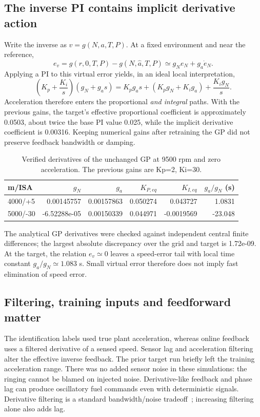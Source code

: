 \documentclass[11pt,a4paper]{article}
\begin{document}
\subsection{The inverse PI contains implicit derivative action}
Write the inverse as $v=g(N,a,T,P)$. At a fixed environment and near the reference,
\begin{equation}
e_v=g(r,0,T,P)-g(N,\hat a,T,P)\simeq g_N e_N+g_a\dot e_N.
\end{equation}
Applying a PI to this virtual error yields, in an ideal local interpretation,
\begin{equation}
\left(K_p+\frac{K_i}{s}\right)(g_N+g_as)
=K_pg_as+(K_pg_N+K_ig_a)+\frac{K_ig_N}{s}.
\end{equation}
Acceleration therefore enters the proportional \emph{and integral} paths. With the previous gains, the target's effective proportional coefficient is approximately 0.0503, about twice the base PI value 0.025, while the implicit derivative coefficient is 0.00316. Keeping numerical gains after retraining the GP did not preserve feedback bandwidth or damping.

\begin{table}[H]\centering\small\setlength{\tabcolsep}{5pt}
\begin{tabular}{@{}lrrrrr@{}}\toprule
m/ISA & $g_N$ & $g_a$ & $K_{P,eq}$ & $K_{I,eq}$ & $g_a/g_N$ (s)\\\midrule
4000/+5 & 0.00145757 & 0.00157863 & 0.050274 & 0.043727 & 1.0831\\
5000/-30 & -6.52288e-05 & 0.00150339 & 0.044971 & -0.0019569 & -23.048\\
\bottomrule\end{tabular}\caption{Verified derivatives of the unchanged GP at 9500 rpm and zero acceleration. The previous gains are Kp=2, Ki=30.}\end{table}

The analytical GP derivatives were checked against independent central finite differences; the largest absolute discrepancy over the grid and target is 1.72e-09. At the target, the relation $e_v\simeq0$ leaves a speed-error tail with local time constant $g_a/g_N\simeq1.083$ s. Small virtual error therefore does not imply fast elimination of speed error.

\subsection{Filtering, training inputs and feedforward matter}
The identification labels used true plant acceleration, whereas online feedback uses a filtered derivative of a sensed speed. Sensor lag and acceleration filtering alter the effective inverse feedback. The prior target run briefly left the training acceleration range. There was no added sensor noise in these simulations: the ringing cannot be blamed on injected noise. Derivative-like feedback and phase lag can produce oscillatory fuel commands even with deterministic signals. Derivative filtering is a standard bandwidth/noise tradeoff~\cite{pid}; increasing filtering alone also adds lag.
\end{document}
